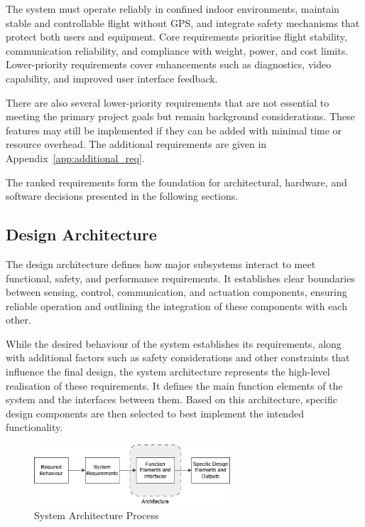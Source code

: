 The system must operate reliably in confined indoor environments, maintain stable and controllable flight without GPS, and integrate safety mechanisms that protect both users and equipment. Core requirements prioritise flight stability, communication reliability, and compliance with weight, power, and cost limits. Lower-priority requirements cover enhancements such as diagnostics, video capability, and improved user interface feedback.

There are also several lower-priority requirements that are not essential to meeting the primary project goals but remain background considerations. These features may still be implemented if they can be added with minimal time or resource overhead. The additional requirements are given in Appendix~\ref{app:additional_req}.

The ranked requirements form the foundation for architectural, hardware, and software decisions presented in the following sections.

\subsection{Design Architecture}

The design architecture defines how major subsystems interact to meet functional, safety, and performance requirements. It establishes clear boundaries between sensing, control, communication, and actuation components, ensuring reliable operation and outlining the integration of these components with each other.

While the desired behaviour of the system establishes its requirements, along with additional factors such as safety considerations and other constraints that influence the final design, the system architecture represents the high-level realisation of these requirements. It defines the main function elements of the system and the interfaces between them. Based on this architecture, specific design components are then selected to best implement the intended functionality.

\begin{figure}[H]
    \centering
    \captionsetup{justification=centering, margin=1cm}
    \includegraphics[width=0.65\textwidth]{img/arch-process.PNG}
    \caption{System Architecture Process}
    \label{fig:arch-process}
\end{figure}


